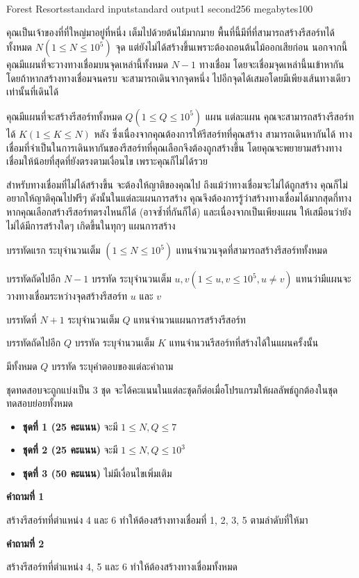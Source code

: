 \documentclass[11pt,a4paper]{article}
\begin{document}
\begin{problem}{Forest Resorts}{standard input}{standard output}{1 second}{256 megabytes}{100}

คุณเป็นเจ้าของที่ที่ใหญ่มาอยู่ที่หนึ่ง เต็มไปด้วยต้นไม้มากมาย พื้นที่นี้มีที่ที่สามารถสร้างรีสอร์ทได้ทั้งหมด $N (1 \leq N \leq 10^5)$ จุด แต่ยังไม่ได้สร้างขึ้นเพราะต้องถอนต้นไม้ออกเสียก่อน นอกจากนี้ คุณมีแผนที่จะวางทางเชื่อมบนจุดเหล่านี้ทั้งหมด $N - 1$ ทางเชื่อม โดยจะเชื่อมจุดเหล่านี้นเข้าหากัน โดยถ้าหากสร้างทางเชื่อมจนครบ จะสามารถเดินจากจุดหนึ่ง ไปอีกจุดได้เสมอโดยมีเพียงเส้นทางเดียวเท่านั้นที่เดินได้

คุณมีแผนที่จะสร้างรีสอร์ททั้งหมด $Q (1 \leq Q \leq 10^5)$ แผน แต่ละแผน คุณจะสามารถสร้างรีสอร์ทได้ $K (1 \leq K \leq N)$ หลัง ซึ่งเนื่องจากคุณต้องการให้รีสอร์ทที่คุณสร้าง สามารถเดินหากันได้ ทางเชื่อมที่จำเป็นในการเดินหากันของรีสอร์ทที่คุณเลือกจึงต้องถูกสร้างขึ้น โดยคุณจะพยายามสร้างทางเชื่อมให้น้อยที่สุดที่ยังตรงตามเงื่อนไข เพราะคุณก็ไม่ได้รวย

สำหรับทางเชื่อมที่ไม่ได้สร้างขึ้น จะต้องให้ญาติของคุณไป ถึงแม้ว่าทางเชื่อมจะไม่ได้ถูกสร้าง คุณก็ไม่อยากให้ญาติคุณไปฟรีๆ ดังนั้นในแต่ละแผนการสร้าง คุณจึงต้องการรู้ว่าสร้างทางเชื่อมได้มากสุดกี่ทาง หากคุณเลือกสร้างรีสอร์ทตรงไหนก็ได้ (อาจซ้ำที่กันก็ได้) และเนื่องจากเป็นเพียงแผน ให้เสมือนว่ายังไม่ได้มีการสร้างใดๆ เกิดขึ้นในทุกๆ แผนการสร้าง

\InputFile
บรรทัดแรก ระบุจำนวนเต็ม $(1 \leq N \leq 10^5)$ แทนจำนวนจุดที่สามารถสร้างรีสอร์ททั้งหมด

บรรทัดถัดไปอีก $N - 1$ บรรทัด ระบุจำนวนเต็ม $u, v (1 \leq u, v \leq 10^5, u \neq v)$ แทนว่ามีแผนจะวางทางเชื่อมระหว่างจุดสร้างรีสอร์ท $u$ และ $v$

บรรทัดที่ $N + 1$ ระบุจำนวนเต็ม $Q$ แทนจำนวนแผนการสร้างรีสอร์ท

บรรทัดถัดไปอีก $Q$ บรรทัด ระบุจำนวนเต็ม $K$ แทนจำนวนรีสอร์ทที่สร้างได้ในแผนครั้งนั้น

\OutputFile
มีทั้งหมด $Q$ บรรทัด ระบุคำตอบของแต่ละคำถาม

\Scoring
ชุดทดสอบจะถูกแบ่งเป็น 3 ชุด จะได้คะแนนในแต่ละชุดก็ต่อเมื่อโปรแกรมให้ผลลัพธ์ถูกต้องในชุดทดสอบย่อยทั้งหมด

\begin{itemize}
\item \textbf{ชุดที่ 1 (25 คะแนน)} จะมี $1 \leq N, Q\leq 7$

\item \textbf{ชุดที่ 2 (25 คะแนน)} จะมี $1 \leq N, Q\leq 10^3$

\item \textbf{ชุดที่ 3 (50 คะแนน)} ไม่มีเงื่อนไขเพิ่มเติม
\end{itemize}

\Example

\begin{example}
%
\end{example}

\Note
\textbf{คำถามที่ 1}

สร้างรีสอร์ทที่ตำแหน่ง 4 และ 6 ทำให้ต้องสร้างทางเชื่อมที่ 1, 2, 3, 5 ตามลำดับที่ให้มา

\textbf{คำถามที่ 2}

สร้างรีสอร์ทที่ตำแหน่ง 4, 5 และ 6 ทำให้ต้องสร้างทางเชื่อมทั้งหมด

\end{problem}
\end{document}
